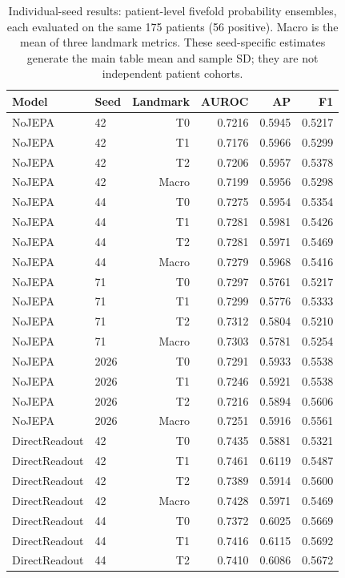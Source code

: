 \begin{table}[t]
\centering
\small
\caption{Individual-seed results: patient-level fivefold probability ensembles, each evaluated on the same 175 patients (56 positive). Macro is the mean of three landmark metrics. These seed-specific estimates generate the main table mean and sample SD; they are not independent patient cohorts.}
\label{tab:seedresults}
\begin{tabular}{llrrrr}
\toprule
Model & Seed & Landmark & AUROC & AP & F1 \\
\midrule
NoJEPA & 42 & T0 & 0.7216 & 0.5945 & 0.5217 \\
NoJEPA & 42 & T1 & 0.7176 & 0.5966 & 0.5299 \\
NoJEPA & 42 & T2 & 0.7206 & 0.5957 & 0.5378 \\
NoJEPA & 42 & Macro & 0.7199 & 0.5956 & 0.5298 \\
NoJEPA & 44 & T0 & 0.7275 & 0.5954 & 0.5354 \\
NoJEPA & 44 & T1 & 0.7281 & 0.5981 & 0.5426 \\
NoJEPA & 44 & T2 & 0.7281 & 0.5971 & 0.5469 \\
NoJEPA & 44 & Macro & 0.7279 & 0.5968 & 0.5416 \\
NoJEPA & 71 & T0 & 0.7297 & 0.5761 & 0.5217 \\
NoJEPA & 71 & T1 & 0.7299 & 0.5776 & 0.5333 \\
NoJEPA & 71 & T2 & 0.7312 & 0.5804 & 0.5210 \\
NoJEPA & 71 & Macro & 0.7303 & 0.5781 & 0.5254 \\
NoJEPA & 2026 & T0 & 0.7291 & 0.5933 & 0.5538 \\
NoJEPA & 2026 & T1 & 0.7246 & 0.5921 & 0.5538 \\
NoJEPA & 2026 & T2 & 0.7216 & 0.5894 & 0.5606 \\
NoJEPA & 2026 & Macro & 0.7251 & 0.5916 & 0.5561 \\
DirectReadout & 42 & T0 & 0.7435 & 0.5881 & 0.5321 \\
DirectReadout & 42 & T1 & 0.7461 & 0.6119 & 0.5487 \\
DirectReadout & 42 & T2 & 0.7389 & 0.5914 & 0.5600 \\
DirectReadout & 42 & Macro & 0.7428 & 0.5971 & 0.5469 \\
DirectReadout & 44 & T0 & 0.7372 & 0.6025 & 0.5669 \\
DirectReadout & 44 & T1 & 0.7416 & 0.6115 & 0.5692 \\
DirectReadout & 44 & T2 & 0.7410 & 0.6086 & 0.5672 \\

\end{tabular}
\end{table}
